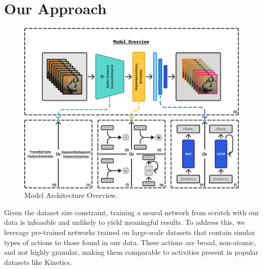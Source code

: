 
\section{Our Approach}

\begin{figure}[t]
    \centering
    \includegraphics[width=\textwidth]{../../assets/figures/model-overview.png}
    \caption{Model Architecture Overview.}
    \label{figure:model-architecture-overview}
\end{figure}


Given the dataset size constraint, training a neural network from scratch with our data is infeasible and unlikely to yield meaningful results. To address this, we leverage pre-trained networks trained on large-scale datasets that contain similar types of actions to those found in our data. These actions are broad, non-atomic, and not highly granular, making them comparable to activities present in popular datasets like Kinetics.

